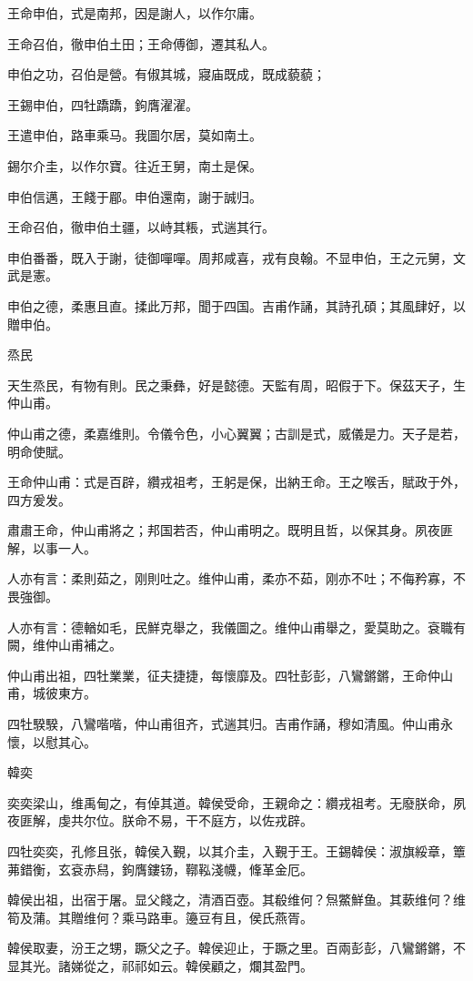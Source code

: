 王命申伯，式是南邦，因是謝人，以作尔庸。

王命召伯，徹申伯土田；王命傅御，遷其私人。

申伯之功，召伯是營。有俶其城，寢庙既成，既成藐藐；

王錫申伯，四牡蹻蹻，鉤膺濯濯。

王遣申伯，路車乘马。我圖尔居，莫如南土。

錫尔介圭，以作尔寶。往近王舅，南土是保。

申伯信邁，王餞于郿。申伯還南，謝于誠归。

王命召伯，徹申伯土疆，以峙其粻，式遄其行。

申伯番番，既入于謝，徒御嘽嘽。周邦咸喜，戎有良翰。不显申伯，王之元舅，文武是憲。

申伯之德，柔惠且直。揉此万邦，聞于四国。吉甫作誦，其詩孔碩；其風肆好，以贈申伯。

烝民

天生烝民，有物有則。民之秉彝，好是懿德。天監有周，昭假于下。保茲天子，生仲山甫。

仲山甫之德，柔嘉维則。令儀令色，小心翼翼；古訓是式，威儀是力。天子是若，明命使賦。

王命仲山甫：式是百辟，纘戎祖考，王躬是保，出納王命。王之喉舌，賦政于外，四方爰发。

肅肅王命，仲山甫將之；邦国若否，仲山甫明之。既明且哲，以保其身。夙夜匪解，以事一人。

人亦有言：柔則茹之，刚則吐之。维仲山甫，柔亦不茹，刚亦不吐；不侮矜寡，不畏強御。

人亦有言：德輶如毛，民鮮克舉之，我儀圖之。维仲山甫舉之，愛莫助之。袞職有闕，维仲山甫補之。

仲山甫出祖，四牡業業，征夫捷捷，每懷靡及。四牡彭彭，八鸞鏘鏘，王命仲山甫，城彼東方。

四牡騤騤，八鸞喈喈，仲山甫徂齐，式遄其归。吉甫作誦，穆如清風。仲山甫永懷，以慰其心。

韓奕

奕奕梁山，维禹甸之，有倬其道。韓侯受命，王親命之：纘戎祖考。无廢朕命，夙夜匪解，虔共尔位。朕命不易，干不庭方，以佐戎辟。

四牡奕奕，孔修且张，韓侯入覲，以其介圭，入覲于王。王錫韓侯：淑旗綏章，簟茀錯衡，玄袞赤舄，鉤膺鏤钖，鞹鞃淺幭，鞗革金厄。

韓侯出祖，出宿于屠。显父餞之，清酒百壺。其殽维何？炰鱉鮮鱼。其蔌维何？维筍及蒲。其贈维何？乘马路車。籩豆有且，侯氏燕胥。

韓侯取妻，汾王之甥，蹶父之子。韓侯迎止，于蹶之里。百兩彭彭，八鸞鏘鏘，不显其光。諸娣從之，祁祁如云。韓侯顧之，爛其盈門。

